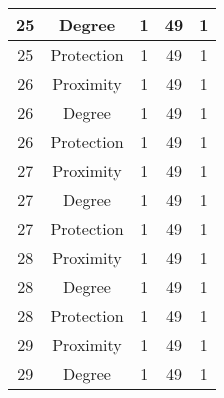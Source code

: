 \documentclass[results.tex]{subfiles}
\begin{document}
\begin{center}
\begin{tabular}{| c || c | c | c | c |}
            \hline
            25                      & Degree                       & 1                      & 49                      & 1                    \\
            \hline
            25                      & Protection                   & 1                      & 49                      & 1                    \\
            \hline
            26                      & Proximity                    & 1                      & 49                      & 1                    \\
            \hline
            26                      & Degree                       & 1                      & 49                      & 1                    \\
            \hline
            26                      & Protection                   & 1                      & 49                      & 1                    \\
            \hline
            27                      & Proximity                    & 1                      & 49                      & 1                    \\
            \hline
            27                      & Degree                       & 1                      & 49                      & 1                    \\
            \hline
            27                      & Protection                   & 1                      & 49                      & 1                    \\
            \hline
            28                      & Proximity                    & 1                      & 49                      & 1                    \\
            \hline
            28                      & Degree                       & 1                      & 49                      & 1                    \\
            \hline
            28                      & Protection                   & 1                      & 49                      & 1                    \\
            \hline
            29                      & Proximity                    & 1                      & 49                      & 1                    \\
            \hline
            29                      & Degree                       & 1                      & 49                      & 1                    \\

\end{tabular}
\end{center}
\end{document}

